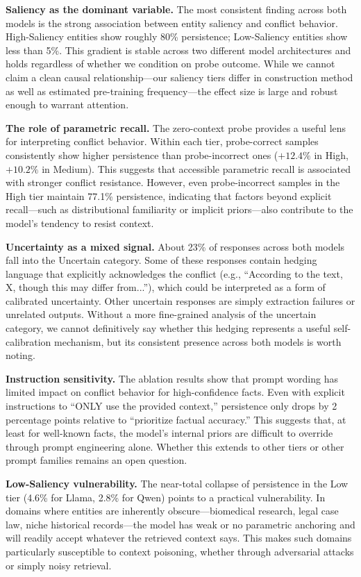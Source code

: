 \documentclass[11pt, letterpaper]{article}
\begin{document}
\textbf{Saliency as the dominant variable.} The most consistent finding across both models is the strong association between entity saliency and conflict behavior. High-Saliency entities show roughly 80\% persistence; Low-Saliency entities show less than 5\%. This gradient is stable across two different model architectures and holds regardless of whether we condition on probe outcome. While we cannot claim a clean causal relationship---our saliency tiers differ in construction method as well as estimated pre-training frequency---the effect size is large and robust enough to warrant attention.

\textbf{The role of parametric recall.} The zero-context probe provides a useful lens for interpreting conflict behavior. Within each tier, probe-correct samples consistently show higher persistence than probe-incorrect ones ($+12.4\%$ in High, $+10.2\%$ in Medium). This suggests that accessible parametric recall is associated with stronger conflict resistance. However, even probe-incorrect samples in the High tier maintain 77.1\% persistence, indicating that factors beyond explicit recall---such as distributional familiarity or implicit priors---also contribute to the model's tendency to resist context.

\textbf{Uncertainty as a mixed signal.} About 23\% of responses across both models fall into the Uncertain category. Some of these responses contain hedging language that explicitly acknowledges the conflict (e.g., ``According to the text, X, though this may differ from...''), which could be interpreted as a form of calibrated uncertainty. Other uncertain responses are simply extraction failures or unrelated outputs. Without a more fine-grained analysis of the uncertain category, we cannot definitively say whether this hedging represents a useful self-calibration mechanism, but its consistent presence across both models is worth noting.

\textbf{Instruction sensitivity.} The ablation results show that prompt wording has limited impact on conflict behavior for high-confidence facts. Even with explicit instructions to ``ONLY use the provided context,'' persistence only drops by 2 percentage points relative to ``prioritize factual accuracy.'' This suggests that, at least for well-known facts, the model's internal priors are difficult to override through prompt engineering alone. Whether this extends to other tiers or other prompt families remains an open question.

\textbf{Low-Saliency vulnerability.} The near-total collapse of persistence in the Low tier (4.6\% for Llama, 2.8\% for Qwen) points to a practical vulnerability. In domains where entities are inherently obscure---biomedical research, legal case law, niche historical records---the model has weak or no parametric anchoring and will readily accept whatever the retrieved context says. This makes such domains particularly susceptible to context poisoning, whether through adversarial attacks or simply noisy retrieval.
\end{document}
